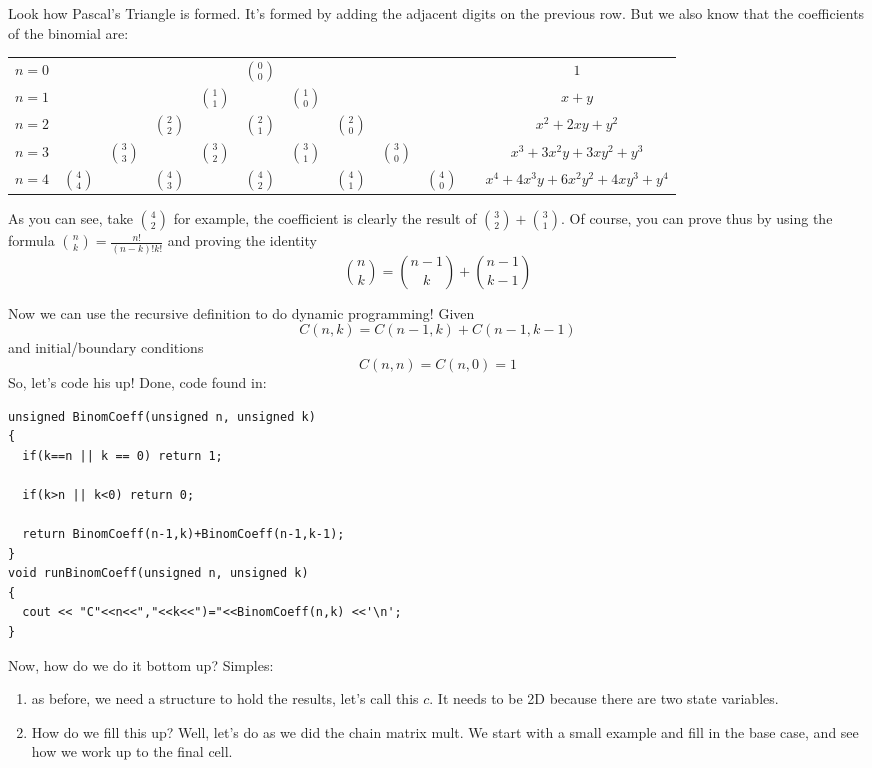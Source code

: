 Look how Pascal's Triangle is formed. It's formed by adding the adjacent
digits on the previous row. But we also know that the coefficients of the
binomial are:

\begin{tabular}{cccccccccccc}
$n=0$ &&&&&$\binom{0}{0}$&&&&    &&$1$\\
$n=1$ &&&&$\binom{1}{1}$&&$\binom{1}{0}$&&&   &&$x+y$\\
$n=2$ &&&$\binom{2}{2}$&&$\binom{2}{1}$&&$\binom{2}{0}$&&  &&$x^2+2xy+y^2$\\
$n=3$ &&$\binom{3}{3}$&&$\binom{3}{2}$&&$\binom{3}{1}$&&$\binom{3}{0}$& &&$x^3+3x^2y+3xy^2+y^3$\\
$n=4$
&$\binom{4}{4}$&&$\binom{4}{3}$&&$\binom{4}{2}$&&$\binom{4}{1}$&&$\binom{4}{0}$&&$x^4+4x^3y+6x^2y^2+4xy^3+y^4$
\end{tabular}

As you can see, take $\binom{4}{2}$ for example, the coefficient is clearly
the result of $\binom{3}{2}+\binom{3}{1}$. Of course, you can prove thus by
using the formula $\displaystyle\binom{n}{k} = \frac{n!}{(n-k)!k!}$ and
proving the identity
\begin{equation*}
\binom{n}{k} = \binom{n-1}{k}+\binom{n-1}{k-1}
\end{equation*}

\qasepline{}

Now we can use the recursive definition to do dynamic programming! Given
\begin{equation*}
C(n,k) = C(n-1,k)+C(n-1,k-1)
\end{equation*}
and initial/boundary conditions
\begin{equation*}
C(n,n) = C(n,0) = 1
\end{equation*}
So, let's code his up! Done, code found in:\\
\begin{lstlisting}[style=raycppnewsnippet]
unsigned BinomCoeff(unsigned n, unsigned k)
{
  if(k==n || k == 0) return 1;

  if(k>n || k<0) return 0;

  return BinomCoeff(n-1,k)+BinomCoeff(n-1,k-1);
}
void runBinomCoeff(unsigned n, unsigned k)
{
  cout << "C"<<n<<","<<k<<")="<<BinomCoeff(n,k) <<'\n';
}
\end{lstlisting}
Now, how do we do it bottom up? Simples:
\begin{enumerate}[label=\textbf{\arabic*.}]
\item as before, we need a structure to hold the results, let's call this
  $c$. It needs to be 2D because there are two state variables.
\item How do we fill this up? Well, let's do as we did the chain matrix
  mult. We start with a small example and fill in the base case, and see how
  we work up to the final cell.
\end{enumerate}


